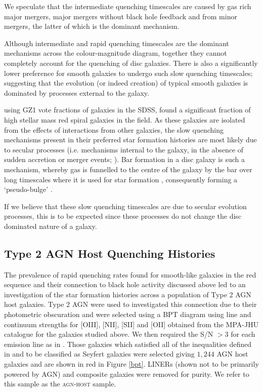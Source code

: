 \documentclass[useAMS,usenatbib]{mn2e}
\begin{document}
We speculate that the intermediate quenching timescales are caused by gas rich major mergers, major mergers without black hole feedback and from minor mergers, the latter of which is the dominant mechanism.

Although intermediate and rapid quenching timescales are the dominant mechanisms across the colour-magnitude diagram, together they cannot completely account for the quenching of disc galaxies. There is also a significantly lower preference for smooth galaxies to undergo such slow quenching timescales; suggesting that the evolution (or indeed creation) of typical smooth galaxies is dominated by processes external to the galaxy. 

\citet{Bamford09} using GZ1 vote fractions of galaxies in the SDSS, found a significant fraction of high stellar mass red spiral galaxies in the field. As these galaxies are isolated from the effects of interactions from other galaxies, the slow quenching mechanisms present in their preferred star formation histories are most likely due to secular processes (i.e. mechanisms internal to the galaxy, in the absence of sudden accretion or merger events; \citealt{KK04, Sheth12}). Bar formation in a disc galaxy is such a mechanism, whereby gas is funnelled to the centre of the galaxy by the bar over long timescales where it is used for star formation \citep{Masters12, Saint12, Cheung13}, consequently forming a `pseudo-bulge' \citep{Kormendy10, Simmons13}.

If we believe that these slow quenching timescales are due to secular evolution processes, this is to be expected since these processes do not change the disc dominated nature of a galaxy. 


\subsection{Type 2 AGN Host Quenching Histories}\label{agn}

The prevalence of rapid quenching rates found for smooth-like galaxies in the red sequence and their connection to black hole activity discussed above led to an investigation of the star formation histories across a population of Type 2 AGN host galaxies. Type 2 AGN were used to investigated this connection due to their photometric obscuration and were selected using a BPT diagram \citep{bpt81} using line and continuum strengths for [OIII], [NII], [SII] and [OII] obtained from the MPA-JHU catalogue \citep{Kauff03, Brinch04} for the galaxies studied above. We then required the S/N $> 3$ for each emission line as in \cite{Sch2010}. Those galaxies which satisfied all of the inequalities defined in \cite{Kew01} and \cite{Kauff03b} to be classified as Seyfert galaxies were selected giving $1,244$ AGN host galaxies and are shown in red in Figure \ref{bpt}. LINERs (shown not to be primarily powered by AGN) and composite galaxies were removed for purity. We refer to this sample as the \textsc{agn-host} sample.
\end{document}
